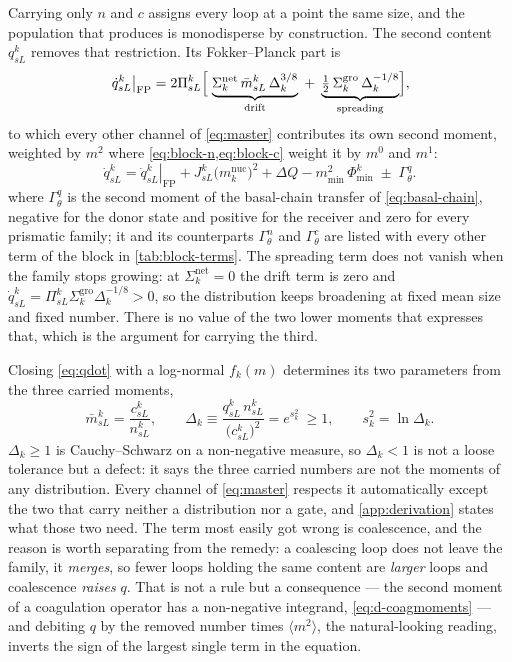 Carrying only $n$ and $c$ assigns every loop at a point the same size, and the
population that produces is monodisperse by construction. The second content
$q^k_{sL}$ removes that restriction. Its Fokker--Planck part is
\begin{equation}
  \left.\dot q^k_{sL}\right|_{\mathrm{FP}}
  = 2\Pi^k_{sL}\Bigl[\;
      \underbrace{\Sigma^{\mathrm{net}}_k\,\bar m^k_{sL}\,\Delta_k^{3/8}}_{\text{drift}}
      \;+\;
      \underbrace{\tfrac12\,\Sigma^{\mathrm{gro}}_k\,\Delta_k^{-1/8}}_{\text{spreading}}
    \Bigr],
  \label{eq:q-FP}
\end{equation}
to which every other channel of \cref{eq:master} contributes its own second
moment, weighted by $m^{2}$ where \cref{eq:block-n,eq:block-c} weight it by
$m^{0}$ and $m^{1}$:
\begin{equation}
  \dot q^k_{sL}=\left.\dot q^k_{sL}\right|_{\mathrm{FP}}
    + J^k_{sL}\bigl(m^{\mathrm{nuc}}_k\bigr)^{2}
    + \Delta Q
    - m_{\min}^{2}\,\Phi^k_{\min}
    \;\pm\;\Gamma^{q}_{\theta}.
  \label{eq:qdot}
\end{equation}
where $\Gamma^{q}_{\theta}$ is the second moment of the basal-chain transfer of
\cref{eq:basal-chain}, negative for the donor state and positive for the
receiver and zero for every prismatic family; it and its counterparts
$\Gamma^{n}_{\theta}$ and $\Gamma^{c}_{\theta}$ are listed with every other term
of the block in \cref{tab:block-terms}. The spreading term does not vanish when
the family stops growing: at
$\Sigma^{\mathrm{net}}_k=0$ the drift term is zero and
$\dot q^k_{sL}=\Pi^k_{sL}\Sigma^{\mathrm{gro}}_k\Delta_k^{-1/8}>0$, so the
distribution keeps broadening at fixed mean size and fixed number. There is no
value of the two lower moments that expresses that, which is the argument for
carrying the third.

Closing \cref{eq:qdot} with a log-normal $f_k(m)$ determines its two parameters
from the three carried moments,
\begin{equation}
  \bar m^k_{sL}=\frac{c^k_{sL}}{n^k_{sL}},
  \qquad
  \Delta_k\equiv\frac{q^k_{sL}\,n^k_{sL}}{\bigl(c^k_{sL}\bigr)^{2}}=e^{s_k^{2}}\ \ge 1,
  \qquad
  s_k^{2}=\ln\Delta_k .
  \label{eq:lognormal}
\end{equation}
$\Delta_k\ge1$ is Cauchy--Schwarz on a non-negative measure, so
$\Delta_k<1$ is not a loose tolerance but a defect: it says the three
carried numbers are not the moments of any distribution. Every channel of
\cref{eq:master} respects it automatically except the two that carry neither a
distribution nor a gate, and \cref{app:derivation} states what those two need. The
term most easily got wrong is coalescence, and the reason is worth separating
from the remedy: a coalescing loop does not leave the family, it \emph{merges},
so fewer loops holding the same content are \emph{larger} loops and coalescence
\emph{raises} $q$. That is not a rule but a consequence --- the second moment of
a coagulation operator has a non-negative integrand, \cref{eq:d-coagmoments} ---
and debiting $q$ by the removed number times $\langle m^{2}\rangle$, the
natural-looking reading, inverts the sign of the largest single term in the
equation.

